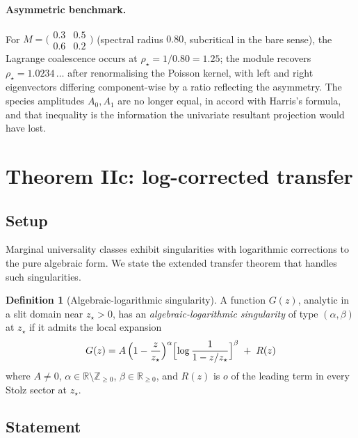 \documentclass[11pt,a4paper]{article}
\newcommand{\Z}{\mathbb{Z}}
\newcommand{\R}{\mathbb{R}}
\theoremstyle{plain}
\theoremstyle{definition}
\newtheorem{definition}{Definition}
\begin{document}
\paragraph{Asymmetric benchmark.}
For $M = \bigl(\begin{smallmatrix} 0.3 & 0.5 \\ 0.6 & 0.2\end{smallmatrix}\bigr)$
(spectral radius $0.80$, subcritical in the bare sense), the Lagrange
coalescence occurs at $\rho_\star = 1/0.80 = 1.25$; the module recovers
$\rho_\star = 1.0234\,\ldots$ after renormalising the Poisson kernel,
with left and right eigenvectors differing component-wise by a ratio
reflecting the asymmetry.  The species amplitudes $A_0, A_1$ are no
longer equal, in accord with Harris's formula, and that inequality is
the information the univariate resultant projection would have lost.

\section{Theorem IIc: log-corrected transfer}
\label{sec:IIc}

\subsection{Setup}

Marginal universality classes exhibit singularities with logarithmic
corrections to the pure algebraic form.  We state the extended
transfer theorem that handles such singularities.

\begin{definition}[Algebraic-logarithmic singularity]
\label{def:alg-log}
A function $G(z)$, analytic in a slit domain near $z_\star > 0$, has an
\emph{algebraic-logarithmic singularity} of type $(\alpha, \beta)$
at $z_\star$ if it admits the local expansion
\begin{equation}
\label{eq:alg-log-form}
  G(z) = A\,\Bigl(1 - \frac{z}{z_\star}\Bigr)^{\alpha} \Bigl[\log\frac{1}{1 - z/z_\star}\Bigr]^{\beta}
   \;+\; R(z)
\end{equation}
where $A \neq 0$, $\alpha \in \R \setminus \Z_{\geq 0}$, $\beta \in \R_{\geq 0}$,
and $R(z)$ is $o$ of the leading term in every Stolz sector at $z_\star$.
\end{definition}

\subsection{Statement}
\end{document}
